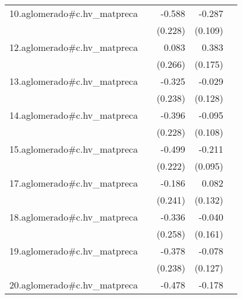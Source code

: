 {\begin{longtable}{l*{4}{D{.}{.}{-1}}}
\addlinespace
10.aglomerado#c.hv\_matpreca&                     &      -0.588\sym{**} &      -0.287\sym{**} &                     \\
            &                     &     (0.228)         &     (0.109)         &                     \\
\addlinespace
12.aglomerado#c.hv\_matpreca&                     &       0.083         &       0.383\sym{*}  &                     \\
            &                     &     (0.266)         &     (0.175)         &                     \\
\addlinespace
13.aglomerado#c.hv\_matpreca&                     &      -0.325         &      -0.029         &                     \\
            &                     &     (0.238)         &     (0.128)         &                     \\
\addlinespace
14.aglomerado#c.hv\_matpreca&                     &      -0.396         &      -0.095         &                     \\
            &                     &     (0.228)         &     (0.108)         &                     \\
\addlinespace
15.aglomerado#c.hv\_matpreca&                     &      -0.499\sym{*}  &      -0.211\sym{*}  &                     \\
            &                     &     (0.222)         &     (0.095)         &                     \\
\addlinespace
17.aglomerado#c.hv\_matpreca&                     &      -0.186         &       0.082         &                     \\
            &                     &     (0.241)         &     (0.132)         &                     \\
\addlinespace
18.aglomerado#c.hv\_matpreca&                     &      -0.336         &      -0.040         &                     \\
            &                     &     (0.258)         &     (0.161)         &                     \\
\addlinespace
19.aglomerado#c.hv\_matpreca&                     &      -0.378         &      -0.078         &                     \\
            &                     &     (0.238)         &     (0.127)         &                     \\
\addlinespace
20.aglomerado#c.hv\_matpreca&                     &      -0.478         &      -0.178         &                     \\

\end{longtable}}
